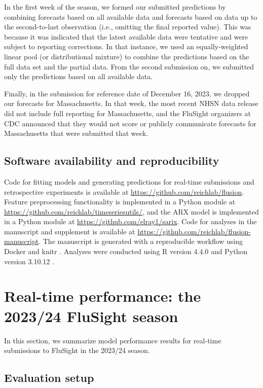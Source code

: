 \documentclass{article}\usepackage[]{graphicx}\usepackage[]{xcolor}
\begin{document}
In the first week of the season, we formed our submitted predictions by combining forecasts based on all available data and forecasts based on data up to the second-to-last observation (i.e., omitting the final reported value). This was because it was indicated that the latest available data were tentative and were subject to reporting corrections. In that instance, we used an equally-weighted linear pool (or distributional mixture) to combine the predictions based on the full data set and the partial data. From the second submission on, we submitted only the predictions based on all available data.

Finally, in the submission for reference date of December 16, 2023, we dropped our forecasts for Massachusetts. In that week, the most recent NHSN data release did not include full reporting for Massachusetts, and the FluSight organizers at CDC announced that they would not score or publicly communicate forecasts for Massachusetts that were submitted that week.

\subsection{Software availability and reproducibility}

Code for fitting models and generating predictions for real-time submissions and retrospective experiments is available at \url{https://github.com/reichlab/flusion}. Feature preprocessing functionality is implemented in a Python module at \url{https://github.com/reichlab/timeseriesutils/}, and the ARX model is implemented in a Python module at \url{https://github.com/elray1/sarix}. Code for analyses in the manuscript and supplement is available at \url{https://github.com/reichlab/flusion-manuscript}. The manuscript is generated with a reproducible workflow using Docker \cite{merkel2014docker} and knitr \cite{xie2014knitr}. Analyses were conducted using R version 4.4.0 \cite{RSoftware} and Python version 3.10.12 \cite{PythonSoftware}.

\section{Real-time performance: the 2023/24 FluSight season}
\label{sec:real-time-results}

In this section, we summarize model performance results for real-time submissions to FluSight in the 2023/24 season.

\subsection{Evaluation setup}
\end{document}
